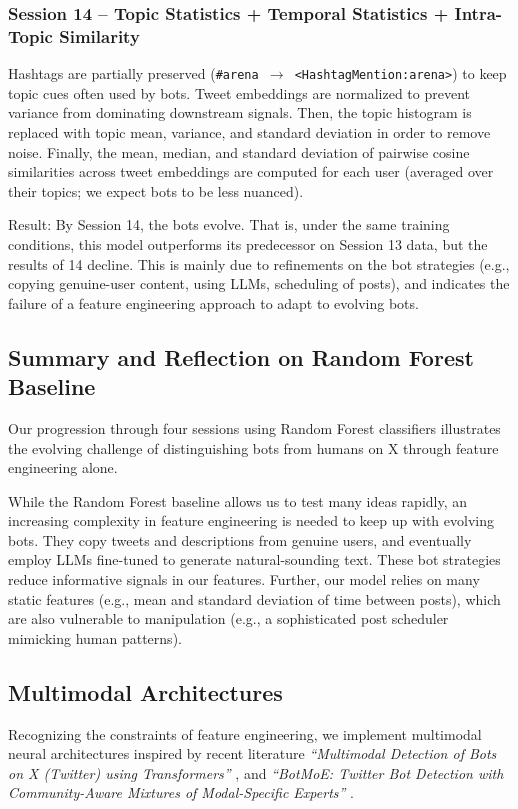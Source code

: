 \documentclass[conference]{IEEEtran}
\begin{document}
\subsubsection{\textbf{Session 14} – Topic Statistics + Temporal Statistics + Intra-Topic Similarity}
Hashtags are partially preserved (\texttt{\#arena $\rightarrow$ <HashtagMention:arena>}) to keep topic cues often used by bots.
Tweet embeddings are normalized to prevent variance from dominating downstream signals. Then, the topic histogram is replaced with topic mean, variance, and standard deviation in order to remove noise. Finally, the mean, median, and standard deviation of pairwise cosine similarities across tweet embeddings are computed for each user (averaged over their topics; we expect bots to be less nuanced).

Result:
By Session 14, the bots evolve. That is, under
the same training conditions, 
this model outperforms its predecessor on Session 13 data, 
but the results of 14 decline. This is mainly due to refinements
on the bot strategies (e.g., copying genuine-user content, using LLMs, scheduling of posts),
and indicates the failure of a feature engineering 
approach to adapt to evolving bots.

\subsection{Summary and Reflection on Random Forest Baseline}
Our progression through four sessions using Random Forest classifiers
illustrates the evolving challenge of distinguishing bots from humans on 
X through feature engineering alone.


While the Random Forest baseline allows us to test many ideas rapidly, 
an increasing complexity in feature engineering is needed to keep up
with evolving bots. They copy tweets and descriptions
from genuine users, and eventually employ LLMs fine-tuned to generate natural-sounding text.
These bot strategies reduce informative signals in our features.
Further, our model relies on many static features (e.g., mean and standard deviation of time between posts),
which are also vulnerable to manipulation (e.g., a sophisticated post scheduler mimicking human patterns).


\subsection{\textbf{Multimodal Architectures}}
Recognizing the constraints of feature engineering, we
implement multimodal neural architectures inspired by recent
literature \textit{``Multimodal Detection of Bots on X (Twitter) using
Transformers''} \citep{ilias2023multimodal}, and \textit{``BotMoE: Twitter Bot Detection with Community-Aware
Mixtures of Modal-Specific Experts''} \citep{liu2023botmoe}.
\end{document}
